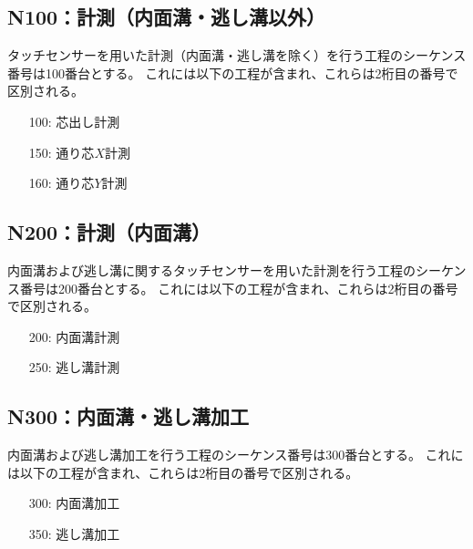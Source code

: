 \subsection{N100：計測（内面溝・逃し溝以外）}
タッチセンサーを用いた計測（内面溝・逃し溝を除く）を行う工程のシーケンス番号は100番台とする。
これには以下の工程が含まれ、これらは2桁目の番号で区別される。
\begin{enumerate}
\item[100:] 芯出し計測
\item[150:] 通り芯$X$計測
\item[160:] 通り芯$Y$計測
\end{enumerate}


\subsection{N200：計測（内面溝）}
内面溝および逃し溝に関するタッチセンサーを用いた計測を行う工程のシーケンス番号は200番台とする。
これには以下の工程が含まれ、これらは2桁目の番号で区別される。
\begin{enumerate}
\item[200:] 内面溝計測
\item[250:] 逃し溝計測
\end{enumerate}


\subsection{N300：内面溝・逃し溝加工}
内面溝および逃し溝加工を行う工程のシーケンス番号は300番台とする。
これには以下の工程が含まれ、これらは2桁目の番号で区別される。
\begin{enumerate}
\item[300:] 内面溝加工
\item[350:] 逃し溝加工
\end{enumerate}


